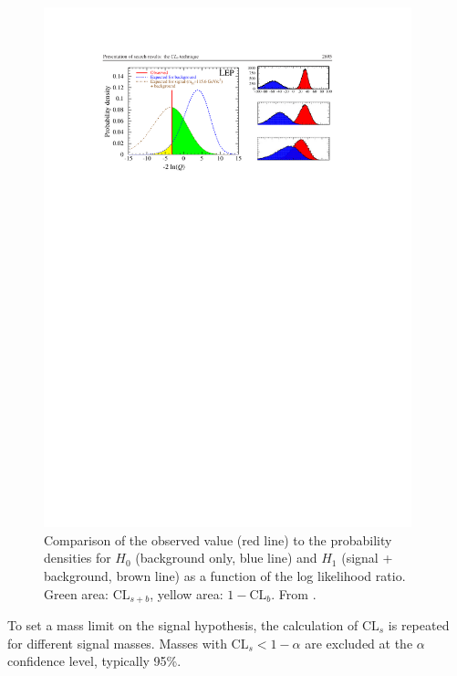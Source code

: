 \begin{figure}[hbt]
\begin{center}
\includegraphics[width=0.95\textwidth]{figures/g21013-fig1.pdf}
\caption{Comparison of the observed value (red line) to the probability densities for $H_{0}$ (background only, blue line) and $H_{1}$ (signal + background, brown line) as a function of the log likelihood ratio. Green area: $\text{CL}_{s+b}$, yellow area: $1-\text{CL}_{b}$. From \cite{Read:presentation}.}
\label{fig:q}
\end{center}
\end{figure}

To set a mass limit on the signal hypothesis, the calculation of $\text{CL}_{s}$ is repeated for different signal masses. Masses with $\text{CL}_{s} < 1 - \alpha$ are excluded at the $\alpha$ confidence level, typically 95\%.